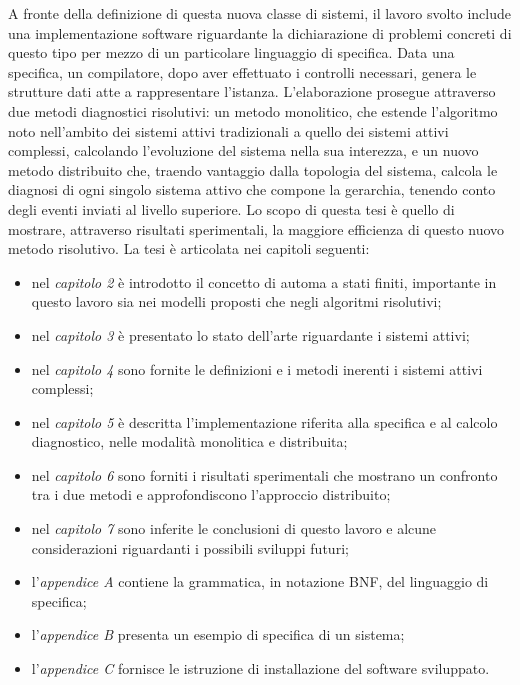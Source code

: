 A fronte della definizione di questa nuova classe di sistemi, il lavoro svolto include una implementazione software riguardante la dichiarazione di problemi concreti di questo tipo per mezzo di un particolare linguaggio di specifica. Data una specifica, un compilatore, dopo aver effettuato i controlli necessari, genera le strutture dati atte a rappresentare l'istanza. L'elaborazione prosegue attraverso due metodi diagnostici risolutivi: un metodo monolitico, che estende l'algoritmo noto nell'ambito dei sistemi attivi tradizionali a quello dei sistemi attivi complessi, calcolando l'evoluzione del sistema nella sua interezza, e un nuovo metodo distribuito che, traendo vantaggio dalla topologia del sistema, calcola le diagnosi di ogni singolo sistema attivo che compone la gerarchia, tenendo conto degli eventi inviati al livello superiore. Lo scopo di questa tesi è quello di mostrare, attraverso risultati sperimentali, la maggiore efficienza di questo nuovo metodo risolutivo.
La tesi è articolata nei capitoli seguenti:
\begin{itemize}
\item nel \emph{capitolo 2} è introdotto il concetto di automa a stati finiti, importante in questo lavoro sia nei modelli proposti che negli algoritmi risolutivi;
\item nel \emph{capitolo 3} è presentato lo stato dell'arte riguardante i sistemi attivi;
\item nel \emph{capitolo 4} sono fornite le definizioni e i metodi inerenti i sistemi attivi complessi;
\item nel \emph{capitolo 5} è descritta l'implementazione riferita alla specifica e al calcolo diagnostico,  nelle modalità monolitica e distribuita;
\item nel \emph{capitolo 6} sono forniti i risultati sperimentali che mostrano un confronto tra i due metodi e approfondiscono l'approccio distribuito;
\item nel \emph{capitolo 7} sono inferite le conclusioni di questo lavoro e alcune considerazioni riguardanti i possibili sviluppi futuri;
\item l'\emph{appendice A} contiene la grammatica, in notazione BNF, del linguaggio di specifica;
\item l'\emph{appendice B} presenta un esempio di specifica di un sistema;
\item l'\emph{appendice C} fornisce le istruzione di installazione del software sviluppato.
\end{itemize}
